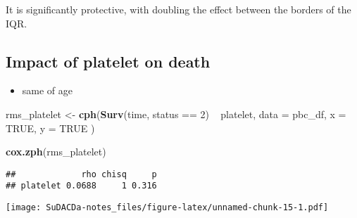 \documentclass[]{book}
\newenvironment{Shaded}{\begin{snugshade}}{\end{snugshade}}
\newcommand{\KeywordTok}[1]{\textcolor[rgb]{0.13,0.29,0.53}{\textbf{{#1}}}}
\newcommand{\DataTypeTok}[1]{\textcolor[rgb]{0.13,0.29,0.53}{{#1}}}
\newcommand{\DecValTok}[1]{\textcolor[rgb]{0.00,0.00,0.81}{{#1}}}
\newcommand{\StringTok}[1]{\textcolor[rgb]{0.31,0.60,0.02}{{#1}}}
\newcommand{\OtherTok}[1]{\textcolor[rgb]{0.56,0.35,0.01}{{#1}}}
\newcommand{\NormalTok}[1]{{#1}}
\providecommand{\tightlist}{%
  \setlength{\itemsep}{0pt}\setlength{\parskip}{0pt}}
\theoremstyle{definition}
\theoremstyle{definition}
\theoremstyle{definition}
\theoremstyle{remark}
\begin{document}
It is significantly protective, with doubling the effect between the
borders of the IQR.

\subsection{\texorpdfstring{Impact of \textbf{platelet} on
death}{Impact of platelet on death}}\label{platelet2}

\begin{itemize}
\tightlist
\item
  same of age
\end{itemize}

\begin{Shaded}
\begin{Highlighting}[]
\NormalTok{rms_platelet <-}\StringTok{ }\KeywordTok{cph}\NormalTok{(}\KeywordTok{Surv}\NormalTok{(time, status ==}\StringTok{ }\DecValTok{2}\NormalTok{) ~}\StringTok{ }\NormalTok{platelet,}
  \DataTypeTok{data =} \NormalTok{pbc_df,}
  \DataTypeTok{x    =} \OtherTok{TRUE}\NormalTok{,}
  \DataTypeTok{y    =} \OtherTok{TRUE}
\NormalTok{)}

\KeywordTok{cox.zph}\NormalTok{(rms_platelet)}
\end{Highlighting}
\end{Shaded}

\begin{verbatim}
##             rho chisq     p
## platelet 0.0688     1 0.316
\end{verbatim}

\begin{Shaded}
\end{Shaded}

\texttt{[image: SuDACDa-notes\_files/figure-latex/unnamed-chunk-15-1.pdf]}

\begin{Shaded}
\end{Shaded}
\end{document}
